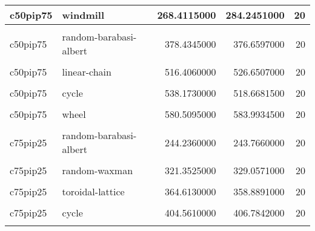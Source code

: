 \documentclass[
]{book}
\begin{document}
\begin{table}
\begin{tabular}{l|l|r|r|r}
\hline
c50pip75 & windmill & 268.4115000 & 284.2451000 & 20\\
\hline
\cellcolor{gray!6}{c50pip75} & \cellcolor{gray!6}{random-waxman} & \cellcolor{gray!6}{344.5975000} & \cellcolor{gray!6}{337.5601000} & \cellcolor{gray!6}{20}\\
\hline
c50pip75 & random-barabasi-albert & 378.4345000 & 376.6597000 & 20\\
\hline
\cellcolor{gray!6}{c50pip75} & \cellcolor{gray!6}{toroidal-lattice} & \cellcolor{gray!6}{382.7610000} & \cellcolor{gray!6}{377.3860000} & \cellcolor{gray!6}{20}\\
\hline
c50pip75 & linear-chain & 516.4060000 & 526.6507000 & 20\\
\hline
\cellcolor{gray!6}{c50pip75} & \cellcolor{gray!6}{comet-kite} & \cellcolor{gray!6}{520.2015000} & \cellcolor{gray!6}{517.2678500} & \cellcolor{gray!6}{20}\\
\hline
c50pip75 & cycle & 538.1730000 & 518.6681500 & 20\\
\hline
\cellcolor{gray!6}{c50pip75} & \cellcolor{gray!6}{star} & \cellcolor{gray!6}{580.5000000} & \cellcolor{gray!6}{575.3854500} & \cellcolor{gray!6}{20}\\
\hline
c50pip75 & wheel & 580.5095000 & 583.9934500 & 20\\
\hline
\cellcolor{gray!6}{c75pip25} & \cellcolor{gray!6}{well-mixed} & \cellcolor{gray!6}{214.6415000} & \cellcolor{gray!6}{213.1840000} & \cellcolor{gray!6}{20}\\
\hline
c75pip25 & random-barabasi-albert & 244.2360000 & 243.7660000 & 20\\
\hline
\cellcolor{gray!6}{c75pip25} & \cellcolor{gray!6}{windmill} & \cellcolor{gray!6}{282.1830000} & \cellcolor{gray!6}{281.7641500} & \cellcolor{gray!6}{20}\\
\hline
c75pip25 & random-waxman & 321.3525000 & 329.0571000 & 20\\
\hline
\cellcolor{gray!6}{c75pip25} & \cellcolor{gray!6}{star} & \cellcolor{gray!6}{353.5715000} & \cellcolor{gray!6}{355.4357000} & \cellcolor{gray!6}{20}\\
\hline
c75pip25 & toroidal-lattice & 364.6130000 & 358.8891000 & 20\\
\hline
\cellcolor{gray!6}{c75pip25} & \cellcolor{gray!6}{comet-kite} & \cellcolor{gray!6}{373.8350000} & \cellcolor{gray!6}{367.9652500} & \cellcolor{gray!6}{20}\\
\hline
c75pip25 & cycle & 404.5610000 & 406.7842000 & 20\\
\hline
\cellcolor{gray!6}{c75pip25} & \cellcolor{gray!6}{linear-chain} & \cellcolor{gray!6}{405.0900000} & \cellcolor{gray!6}{408.0693500} & \cellcolor{gray!6}{20}\\

\end{tabular}
\end{table}
\end{document}
